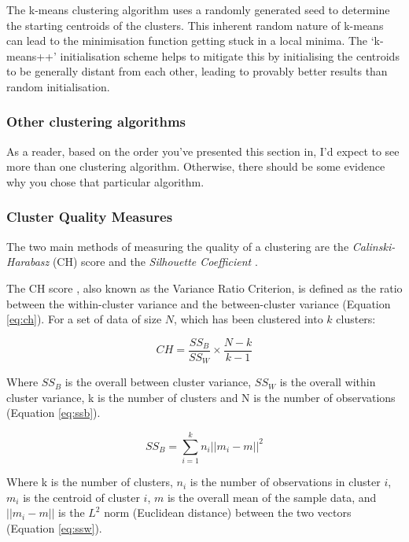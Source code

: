 \documentclass[12pt, a4paper]{article}
\begin{document}
The k-means clustering algorithm uses a randomly generated seed to determine the starting centroids of the clusters. This inherent random nature of k-means can lead to the minimisation function getting stuck in a local minima. The `k-means++' initialisation scheme helps to mitigate this by initialising the centroids to be generally distant from each other, leading to provably better results than random initialisation. 

\subsubsection{Other clustering algorithms}

As a reader, based on the order you've presented this section in, I'd expect to see more than one clustering algorithm. Otherwise, there should be some evidence why you chose that particular algorithm.

\subsubsection{Cluster Quality Measures}
The two main methods of measuring the quality of a clustering are the \textit{Calinski-Harabasz} (CH) score and the \textit{Silhouette Coefficient} \cite{cluster-measures}.

The CH score \cite{ch-score}, also known as the Variance Ratio Criterion, is defined as the ratio between the within-cluster variance and the between-cluster variance (Equation \ref{eq:ch}). For a set of data of size $N$, which has been clustered into $k$ clusters:

\begin{equation}
    CH = \frac{SS_B}{SS_W}\times\frac{N-k}{k-1}
    \label{eq:ch}
\end{equation}
 
Where $SS_B$ is the overall between cluster variance, $SS_W$ is the overall within cluster variance, k is the number of clusters and N is the number of observations (Equation \ref{eq:ssb}). 

\begin{equation}
    SS_B = \sum_{i=1}^kn_i\vert\vert m_i - m\vert\vert ^2
    \label{eq:ssb}
\end{equation}

Where k is the number of clusters, $n_i$ is the number of observations in cluster $i$, $m_i$ is the centroid of cluster $i$, $m$ is the overall mean of the sample data, and $||m_i - m||$ is the $L^2$ norm (Euclidean distance) between the two vectors (Equation \ref{eq:ssw}).
\end{document}
